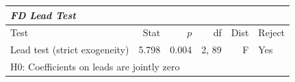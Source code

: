 \renewcommand{\arraystretch}{1.1}
\setlength{\tabcolsep}{6pt}
\begin{table}[H]
\centering
\begin{tabular}{lrrrrl}
\hline
\multicolumn{6}{l}{\textit{FD Lead Test}} \\
\hline
Test & Stat & $p$ & df & Dist & Reject \\
\hline
Lead test (strict exogeneity) & 5.798 & 0.004 & 2, 89 & F & Yes \\
\multicolumn{6}{l}{\footnotesize{H0: Coefficients on leads are jointly zero}} \\
\hline
\end{tabular}
\end{table}